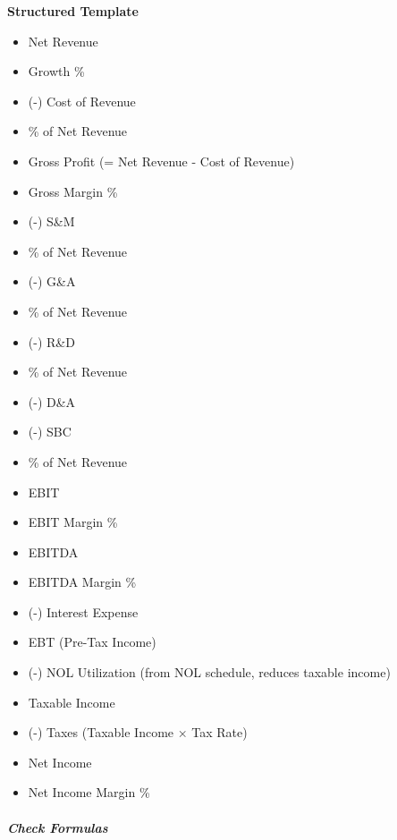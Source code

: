 \documentclass[11pt]{article}
\begin{document}
\textbf{Structured Template}
\begin{itemize}[leftmargin=*,itemsep=2pt,topsep=2pt]
\item {} Net Revenue
\item {} Growth \%
\item {} (-) Cost of Revenue
\item {} \% of Net Revenue
\item {} Gross Profit (= Net Revenue - Cost of Revenue)
\item {} Gross Margin \%
\item {} (-) S\&M
\item {} \% of Net Revenue
\item {} (-) G\&A
\item {} \% of Net Revenue
\item {} (-) R\&D
\item {} \% of Net Revenue
\item {} (-) D\&A
\item {} (-) SBC
\item {} \% of Net Revenue
\item {} EBIT
\item {} EBIT Margin \%
\item {} EBITDA
\item {} EBITDA Margin \%
\item {} (-) Interest Expense
\item {} EBT (Pre-Tax Income)
\item {} (-) NOL Utilization (from NOL schedule, reduces taxable income)
\item {} Taxable Income
\item {} (-) Taxes (Taxable Income × Tax Rate)
\item {} Net Income
\item {} Net Income Margin \%
\end{itemize}

\subparagraph{Check Formulas}\mbox{}\par
\end{document}
